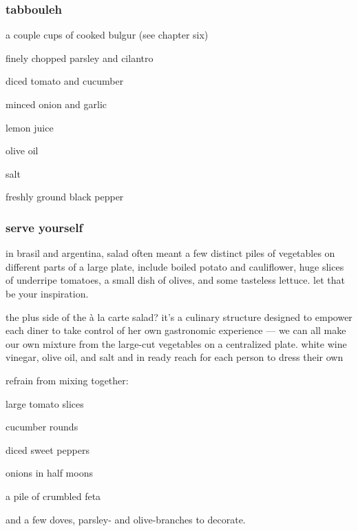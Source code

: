 \subsubsection{tabbouleh}

\begin{ingredients}
  \item a couple cups of cooked bulgur (see chapter six)
  \item finely chopped parsley and cilantro
  \item diced tomato and cucumber
  \item minced onion and garlic
  \item lemon juice
  \item olive oil
  \item salt
  \item freshly ground black pepper
\end{ingredients}

\subsubsection{serve yourself}

in brasil and argentina, salad often meant a few distinct piles of vegetables 
on different parts of a large plate, include boiled potato and cauliflower, 
huge slices of underripe tomatoes, a small dish of olives, and some tasteless 
lettuce. let that be your inspiration.

the plus side of the \`{a} la carte salad? it's a culinary structure designed 
to empower each diner to take control of her own gastronomic experience --- we 
can all make our own mixture from the large-cut vegetables on a centralized 
plate. white wine vinegar, olive oil, and salt and in ready reach for each 
person to dress their own

refrain from mixing together:

\begin{ingredients}
  \item large tomato slices
  \item cucumber rounds
  \item diced sweet peppers
  \item onions in half moons
  \item a pile of crumbled feta
\end{ingredients}

and a few doves, parsley- and olive-branches to decorate.
